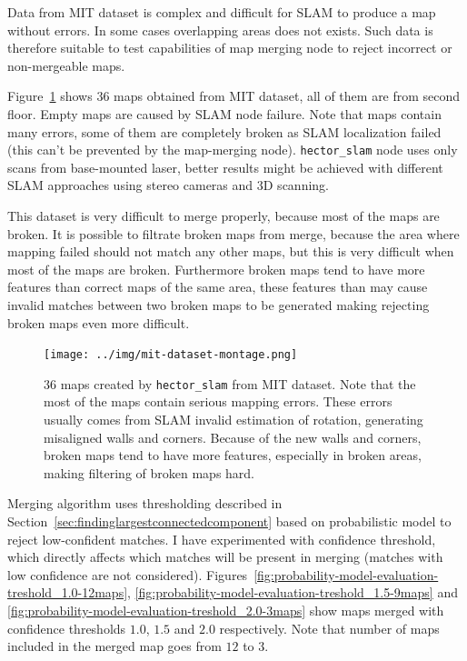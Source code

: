 Data from \gls{MIT} dataset is complex and difficult for \gls{SLAM} to produce a map without errors. In some cases overlapping areas does not exists. Such data is therefore suitable to test capabilities of map merging node to reject incorrect or non-mergeable maps.

Figure~\ref{fig:probability-model-evaluation-montage} shows $36$ maps obtained from \gls{MIT} dataset, all of them are from second floor. Empty maps are caused by \gls{SLAM} node failure. Note that maps contain many errors, some of them are completely broken as \gls{SLAM} localization failed (this can't be prevented by the map-merging node). \texttt{hector\_slam} node uses only scans from base-mounted laser, better results might be achieved with different \gls{SLAM} approaches using stereo cameras and 3D scanning.

This dataset is very difficult to merge properly, because most of the maps are broken. It is possible to filtrate broken maps from merge, because the area where mapping failed should not match any other maps, but this is very difficult when most of the maps are broken. Furthermore broken maps tend to have more features than correct maps of the same area, these features than may cause invalid matches between two broken maps to be generated making rejecting broken maps even more difficult.

\begin{figure}
    \centering
    \texttt{[image: ../img/mit-dataset-montage.png]}
    \caption[$36$ maps created by \texttt{hector\_slam} from \gls{MIT} dataset.]{$36$ maps created by \texttt{hector\_slam} from \gls{MIT} dataset. Note that the most of the maps contain serious mapping errors. These errors usually comes from \gls{SLAM} invalid estimation of rotation, generating misaligned walls and corners. Because of the new walls and corners, broken maps tend to have more features, especially in broken areas, making filtering of broken maps hard.}
    \label{fig:probability-model-evaluation-montage}
\end{figure}

Merging algorithm uses thresholding described in Section~\ref{sec:findinglargestconnectedcomponent} based on probabilistic model to reject low-confident matches. I have experimented with confidence threshold, which directly affects which matches will be present in merging (matches with low confidence are not considered). Figures~\ref{fig:probability-model-evaluation-treshold_1.0-12maps}, \ref{fig:probability-model-evaluation-treshold_1.5-9maps} and \ref{fig:probability-model-evaluation-treshold_2.0-3maps} show maps merged with confidence thresholds $1.0$, $1.5$ and $2.0$ respectively. Note that number of maps included in the merged map goes from $12$ to $3$.

